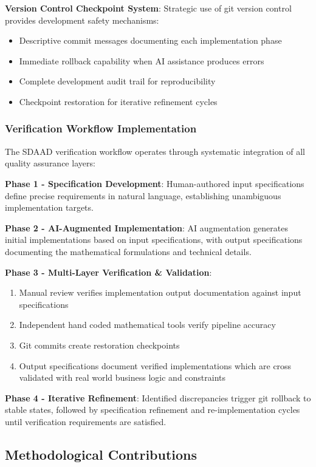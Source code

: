 \textbf{Version Control Checkpoint System}: Strategic use of git version control provides development safety mechanisms:
\begin{itemize}
    \item Descriptive commit messages documenting each implementation phase
    \item Immediate rollback capability when AI assistance produces errors
    \item Complete development audit trail for reproducibility
    \item Checkpoint restoration for iterative refinement cycles
\end{itemize}

\subsubsection{Verification Workflow Implementation}

The SDAAD verification workflow operates through systematic integration of all quality assurance layers:

\textbf{Phase 1 - Specification Development}: Human-authored input specifications define precise requirements in natural language, establishing unambiguous implementation targets.

\textbf{Phase 2 - AI-Augmented Implementation}: AI augmentation generates initial implementations based on input specifications, with output specifications documenting the mathematical formulations and technical details.

\textbf{Phase 3 - Multi-Layer Verification \& Validation}:
\begin{enumerate}
    \item Manual review verifies implementation output documentation against input specifications
    \item Independent hand coded mathematical tools verify pipeline accuracy
    \item Git commits create restoration checkpoints
    \item Output specifications document verified implementations which are cross validated with real world business logic and constraints
\end{enumerate}

\textbf{Phase 4 - Iterative Refinement}: Identified discrepancies trigger git rollback to stable states, followed by specification refinement and re-implementation cycles until verification requirements are satisfied.


\subsection{Methodological Contributions}

